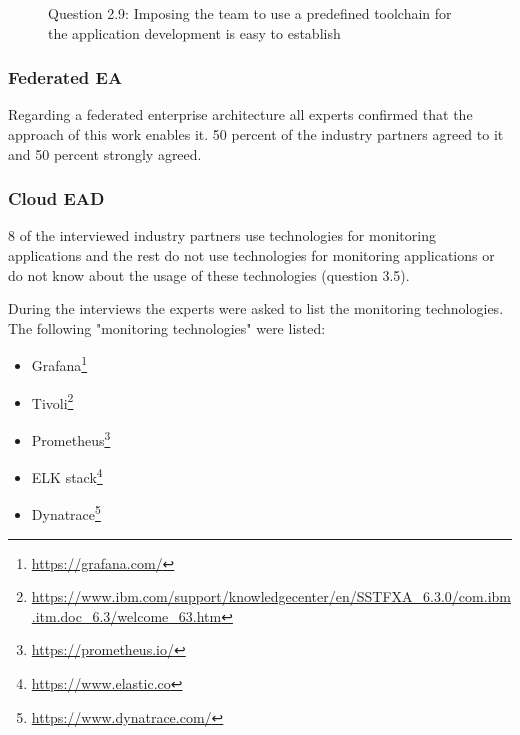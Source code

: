 \begin{figure}[htpb]
\centering
{}
\caption{Question 2.9: Imposing the team to use a predefined toolchain for the application development is easy to establish}
\label{fig:question29}
\end{figure}

\subsubsection{Federated EA}
Regarding a federated enterprise architecture all experts confirmed that the approach of this work enables it. 50 percent of the industry partners agreed to it and 50 percent strongly agreed.

\subsubsection{Cloud EAD}
8 of the interviewed industry partners use technologies for monitoring applications and the rest do not use technologies for monitoring applications or do not know about the usage of these technologies (question 3.5). 

During the interviews the experts were asked to list the monitoring technologies. The following "monitoring technologies" were listed:
\begin{itemize}
    \item Grafana\footnote{\url{https://grafana.com/}}
    \item Tivoli\footnote{\url{https://www.ibm.com/support/knowledgecenter/en/SSTFXA_6.3.0/com.ibm.itm.doc_6.3/welcome_63.htm}}
    \item Prometheus\footnote{\url{https://prometheus.io/}}
    \item ELK stack\footnote{\url{https://www.elastic.co}}
    \item Dynatrace\footnote{\url{https://www.dynatrace.com/}}
\end{itemize}

